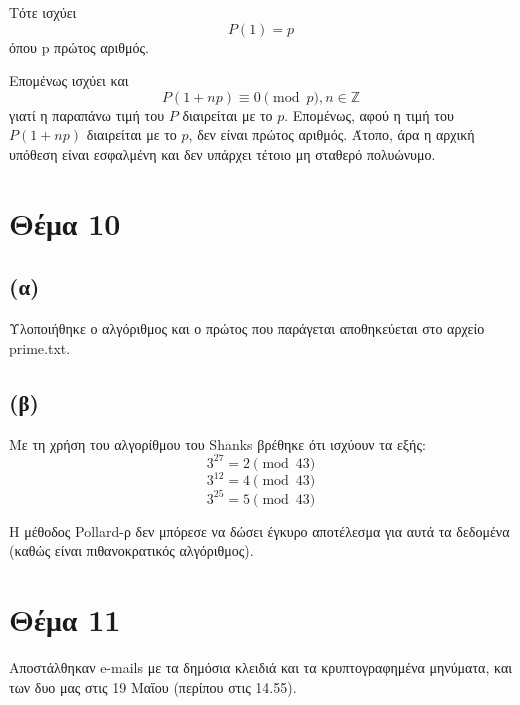 \documentclass[a4paper, 11pt]{article}
\newcommand{\lt}{\latintext}
\begin{document}
Τότε ισχύει
\[P(1) = p\]
όπου p πρώτος αριθμός.

Επομένως ισχύει και
\[P(1 + np) \equiv 0 \pmod{p}, n \in \mathbb{Z} \]
γιατί η παραπάνω τιμή του $P$ διαιρείται με το $p$. Επομένως, αφού η τιμή του $P(1+np)$ διαιρείται με το $p$, δεν είναι πρώτος αριθμός. Άτοπο, άρα η αρχική υπόθεση είναι εσφαλμένη και δεν υπάρχει τέτοιο μη σταθερό πολυώνυμο.

\section*{Θέμα 10}
\subsection*{(α)} Υλοποιήθηκε ο αλγόριθμος και ο πρώτος που παράγεται αποθηκεύεται στο αρχείο {\lt prime.txt}.
\subsection*{(β)} Με τη χρήση του αλγορίθμου του {\lt Shanks} βρέθηκε ότι ισχύουν τα εξής:
\[3^{27} = 2 \pmod{43}\]
\[3^{12} = 4 \pmod{43}\]
\[3^{25} = 5 \pmod{43}\]

Η μέθοδος {\lt Pollard-}ρ δεν μπόρεσε να δώσει έγκυρο αποτέλεσμα για αυτά τα δεδομένα (καθώς είναι πιθανοκρατικός αλγόριθμος).

\section*{Θέμα 11}
Αποστάλθηκαν {\lt e-mails} με τα δημόσια κλειδιά και τα κρυπτογραφημένα μηνύματα, και των δυο μας στις 19 Μαΐου (περίπου στις 14.55).
\end{document}
